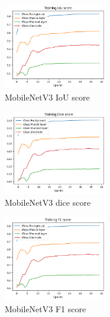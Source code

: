 \begin{figure}[htp!]
    \centering
    \includegraphics[width=0.4\textwidth]{Images/iou.png}
    \caption{MobileNetV3 IoU score}
    \label{fig:iou}
\end{figure}

\begin{figure}[htp!]
    \centering
    \includegraphics[width=0.4\textwidth]{Images/dice.png}
    \caption{MobileNetV3 dice score}
    \label{fig:dice}
\end{figure}

\begin{figure}[htp!]
    \centering
    \includegraphics[width=0.4\textwidth]{Images/f1.png}
    \caption{MobileNetV3 F1 score}
    \label{fig:f1}
\end{figure}
